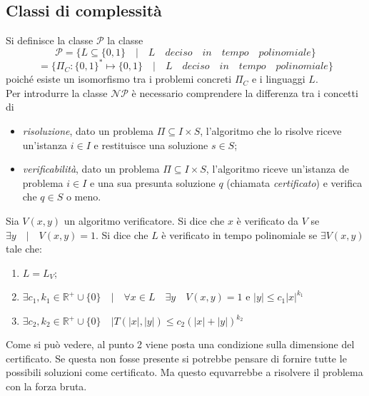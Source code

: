 \documentclass[a4paper,portrait,12pt]{article}
\theoremstyle{definition}
\begin{document}
\subsection{Classi di complessità} 

Si definisce la classe $\mathcal{P}$ la classe
\begin{equation}
\mathcal{P} = \{L \subseteq \{0,1\} \quad | \quad L \quad deciso \quad in \quad tempo \quad polinomiale\} 
\end{equation}
\begin{equation}
= \{\Pi_C : \{0,1\}^* \mapsto \{0,1\} \quad | \quad L \quad deciso \quad in \quad tempo \quad polinomiale\}
\end{equation}
poiché esiste un isomorfismo tra i problemi concreti $\Pi_C$ e i linguaggi $L$.\\

Per introdurre la classe $\mathcal{NP}$ è necessario comprendere la differenza tra i concetti di
\begin{itemize}
	\item \textit{risoluzione}, dato un problema $\Pi \subseteq I\times S$, l'algoritmo che lo risolve riceve 
	un'istanza $i \in I$ e restituisce una soluzione $s \in S$;
	\item \textit{verificabilità}, dato un problema $\Pi \subseteq I\times S$, l'algoritmo riceve 
	un'istanza de problema $i \in I$ e una sua presunta soluzione $q$ (chiamata \textit{certificato}) e verifica 
	che $q \in S$ o meno. 
\end{itemize}
Sia $V(x,y)$ un algoritmo verificatore. Si dice che $x$ è verificato da $V$ se $\exists y \quad | \quad V(x,y) = 1$. Si
dice che $L$ è verificato in tempo polinomiale se $\exists V(x,y)$ tale che:
\begin{enumerate}
	\item $L = L_V$;
	\item $\exists c_1,k_1 \in \mathbb{R}^+\cup \{0\} \quad | \quad \forall x \in L \quad \exists y \quad 
	V(x,y) = 1$ e $\left|y\right| \le c_1 \left|x\right|^{k_1}$
	\item $\exists c_2,k_2 \in \mathbb{R}^+\cup \{0\} \quad | T(\left|x\right|,\left|y\right|) \le 
	c_2 (\left|x\right| + \left|y\right|)^{k_2}$
\end{enumerate}
Come si può vedere, al punto 2 viene posta una condizione sulla dimensione del certificato. Se questa non fosse presente
si potrebbe pensare di fornire tutte le possibili soluzioni come certificato. Ma questo equvarrebbe a risolvere il
problema con la forza bruta.\\
\end{document}
